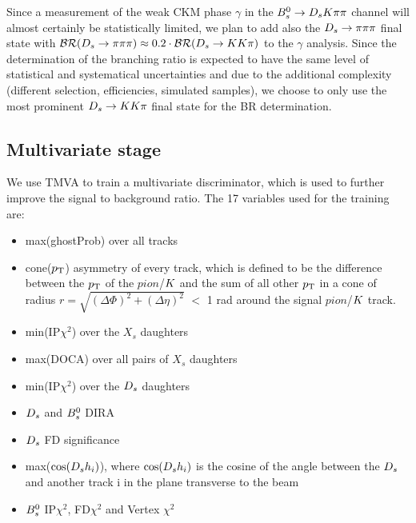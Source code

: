 Since a measurement of the weak CKM phase $\gamma$ in the ${{B}^0_{s}}\rightarrow{\ensuremath{{D}_{s}}}{\ensuremath{K}}{\ensuremath{\pi}}{\ensuremath{\pi}}$ channel will almost certainly be statistically limited, 
we plan to add also the ${{D}_{s}}\rightarrow{\ensuremath{\pi}}{\ensuremath{\pi}}{\ensuremath{\pi}}$ final state with $\mathcal{BR}({{D}_{s}}\rightarrow{\ensuremath{\pi}}{\ensuremath{\pi}}{\ensuremath{\pi}}) \approx 0.2\cdot\mathcal{BR}({{D}_{s}}\rightarrow{\ensuremath{K}}{\ensuremath{K}}{\ensuremath{\pi}})$ to the $\gamma$ analysis. 
Since the determination of the branching ratio is expected to have the same level of statistical and systematical uncertainties and due to the additional complexity (different selection, efficiencies, simulated samples), 
we choose to only use the most prominent ${{D}_{s}}\rightarrow{\ensuremath{K}}{\ensuremath{K}}{\ensuremath{\pi}}$ final state for the BR determination. 


\subsection{Multivariate stage}

We use TMVA \cite{Hocker:2007ht} to train a multivariate discriminator, which is used to further improve the signal to background ratio. 
The 17 variables used for the training are:

\begin{itemize} 

\item max(ghostProb) over all tracks

\item cone($\mbox{$p_{\mathrm{ T}}$}$) asymmetry of every track, 
which is defined to be the difference between the $\mbox{$p_{\mathrm{ T}}$}$ of the $pion$/${K}$ and the sum of all other $\mbox{$p_{\mathrm{ T}}$}$ in a cone of radius $r = \sqrt{(\Delta\Phi)^{2} + (\Delta\eta)^{2}}$ $<$ 1 rad around the signal $pion$/${K}$ track.

\item min(IP$\chi^{2}$) over the $X_{s}$ daughters

\item max(DOCA) over all pairs of $X_{s}$ daughters

\item min(IP$\chi^{2}$) over the ${{D}_{s}}$ daughters

\item ${{D}_{s}}$ and ${{B}^0_{s}}$ DIRA

\item ${{D}_{s}}$ FD significance

\item max($\cos({{D}_{s}} h_{i})$), where $\cos({{D}_{s}} h_{i})$ is the cosine of the angle between the ${{D}_{s}}$ and another track i in the plane transverse to the beam

\item ${{B}^0_{s}}$ IP$\chi^{2}$, FD$\chi^{2}$ and Vertex $\chi^{2}$

\end{itemize}


